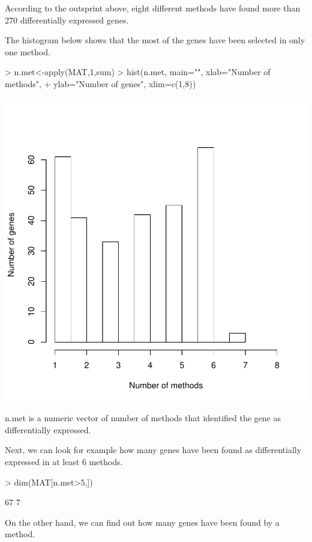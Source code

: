\documentclass[a4paper]{report}
\begin{document}
According to the outsprint above, eight different methods have found more than 270 differentially expressed genes. \par
The histogram below shows that the most of the genes have been selected in only one method. 
\begin{center}
\begin{Schunk}
\begin{Sinput}
> n.met<-apply(MAT,1,sum)
> hist(n.met, main="", xlab="Number of methods", 
+ ylab="Number of genes", xlim=c(1,8))
\end{Sinput}
\end{Schunk}
\includegraphics{MAMA-021}
\end{center}
{\ttfamily n.met} is a numeric vector of number of methods that identified the gene as differentially expressed. \par 
Next, we can look for example how many genes have been found as differentially expressed in at least 6 methods.
\begin{Schunk}
\begin{Sinput}
> dim(MAT[n.met>5,])
\end{Sinput}
\begin{Soutput}
[1] 67  7
\end{Soutput}
\end{Schunk}
On the other hand, we can find out how many genes have been found by a method.
\end{document}
